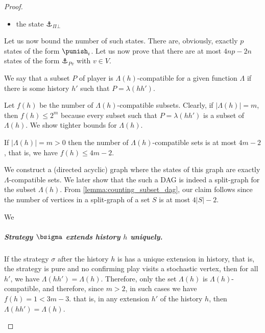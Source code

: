 \begin{proof}
\begin{itemize}
        \item the state $\anchor_{\Pi\bot}$
    \end{itemize}

    Let us now bound the number of such states.
    There are, obviously, exactly $p$ states of the form $\punish_i$.
    Let us now prove that there are at most $4np-2n$ states of the form $\anchor_{Pv}$ with $v \in V$.
    
    We say that a subset $P$ of player is $\Lambda(h)$-compatible for a given function $\Lambda$ if there is some history $h'$ such that $P = \lambda(hh')$.

    Let $f(h)$ be the number of $\Lambda(h)$-compatible subsets.
    Clearly, if $|\Lambda(h)| = m$, then $f(h) \leq 2^m$ because every subset such that $P = \lambda(hh')$ is a subset of $\Lambda(h)$.
We show tighter bounds for $\Lambda(h)$.
    \begin{claim}\label{claim:LambdaCompatible}
         If $|\Lambda(h)| = m > 0$ then the number of $\Lambda(h)$-compatible sets is at most $4m-2$, that is, we have $f(h) \leq 4m-2$.
    \end{claim}
    \begin{claimproof}
        We construct a (directed acyclic) graph where the states of this graph are exactly $\Lambda$-compatible sets. We later show that the such a DAG is indeed a split-graph for the subset $\Lambda(h)$. From \cref{lemma:counting_subset_dag}, our claim follows since the number of vertices in a split-graph of a set $S$ is at most $4|S|-2$.
    \end{claimproof}

    
    \begin{claimproof}
    We 
    \subparagraph*{Strategy $\bsigma$ extends history $h$ uniquely.}If the strategy $\sigma$ after the history $h$ is has a unique extension in history, that is, the strategy is pure and no confirming play visits a stochastic vertex, then 
    for all $h'$, we have $\Lambda(hh') = \Lambda(h)$. Therefore, only the set $\Lambda(h)$ is $\Lambda(h)$-compatible, and therefore, since $m>2$, 
    in such cases we have $f(h) = 1<3m-3$. 
    that is, in any extension $h'$ of the history $h$, then $\Lambda(hh') = \Lambda(h)$.


\end{claimproof}
\end{proof}
